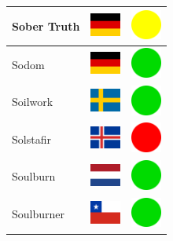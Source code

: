 \documentclass[12pt, a4paper, twoside]{report}
\begin{document}
\begin{center}
\begin{longtable}{|p{5cm}|p{2cm}|p{2cm}|}
 Sober Truth                                                & \includegraphics[width=1cm]{../4x3/de} &   \includegraphics[width=1cm]{../likes/m} \\ \hline
 Sodom                                                      & \includegraphics[width=1cm]{../4x3/de} &   \includegraphics[width=1cm]{../likes/y} \\ \hline
 Soilwork                                                   & \includegraphics[width=1cm]{../4x3/se} &   \includegraphics[width=1cm]{../likes/y} \\ \hline
 Solstafir                                                  & \includegraphics[width=1cm]{../4x3/is} &   \includegraphics[width=1cm]{../likes/n} \\ \hline
 Soulburn                                                   & \includegraphics[width=1cm]{../4x3/nl} &   \includegraphics[width=1cm]{../likes/y} \\ \hline
 Soulburner                                                 & \includegraphics[width=1cm]{../4x3/cl} &   \includegraphics[width=1cm]{../likes/y} \\ \hline

\end{longtable}
\end{center}
\end{document}
